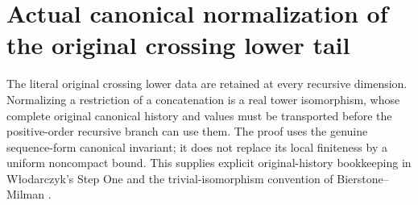 \section{Actual canonical normalization of the original crossing lower tail}

The literal original crossing lower data are retained at every recursive
dimension.  Normalizing a restriction of a concatenation is a real tower
isomorphism, whose complete original canonical history and values must be
transported before the positive-order recursive branch can use them.
The proof uses the genuine sequence-form canonical invariant; it does not
replace its local finiteness by a uniform noncompact bound.  This supplies
explicit original-history bookkeeping in W\l odarczyk's Step One and the
trivial-isomorphism convention of Bierstone--Milman
\cite{wlodarczyk05-hironaka,bierstone-milman08-functoriality}.

